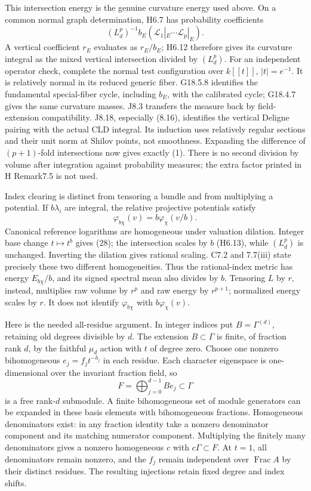 \documentclass[
  10pt,
]{article}
\begin{document}
This intersection energy is the genuine curvature energy used above. On
a common normal graph determination, H6.7 has probability coefficients
\[ (L_d^p)^{-1}b_E(\mathcal L_1|_E\cdots\mathcal L_p|_E). \] A vertical
coefficient \(r_E\) evaluates as \(r_E/b_E\); H6.12 therefore gives its
curvature integral as the mixed vertical intersection divided by
\((L_d^p)\). For an independent operator check, complete the normal test
configuration over \(k[[t]]\), \(|t|=e^{-1}\). It is relatively normal
in its reduced generic fiber. G18.5.8 identifies the fundamental
special-fiber cycle, including \(b_E\), with the calibrated cycle;
G18.4.7 gives the same curvature masses. J8.3 transfers the measure back
by field-extension compatibility. J8.18, especially (8.16), identifies
the vertical Deligne pairing with the actual CLD integral. Its induction
uses relatively regular sections and their unit norm at Shilov points,
not smoothness. Expanding the difference of \((p+1)\)-fold intersections
now gives exactly (1). There is no second division by volume after
integration against probability measures; the extra factor printed in H
Remark7.5 is not used.

Index clearing is distinct from tensoring a bundle and from multiplying
a potential. If \(b\lambda_i\) are integral, the relative projective
potentials satisfy
\[ \varphi_{b\chi}(v)=b\varphi_\chi(v/b).                                                       \tag{28}\]
Canonical reference logarithms are homogeneous under valuation dilation.
Integer base change \(t\mapsto t^b\) gives (28); the intersection scales
by \(b\) (H6.13), while \((L_d^p)\) is unchanged. Inverting the dilation
gives rational scaling. C7.2 and 7.7(iii) state precisely these two
different homogeneities. Thus the rational-index metric has energy
\(E_{b\chi}/b\), and its signed spectral mean also divides by \(b\).
Tensoring \(L\) by \(r\), instead, multiplies raw volume by \(r^p\) and
raw energy by \(r^{p+1}\); normalized energy scales by \(r\). It does
not identify \(\varphi_{b\chi}\) with \(b\varphi_\chi(v)\).

Here is the needed all-residue argument. In integer indices put
\(B=\Gamma^{(d)}\), retaining old degrees divisible by \(d\). The
extension \(B\subset\Gamma\) is finite, of fraction rank \(d\), by the
faithful \(\mu_d\) action with \(t\) of degree zero. Choose one nonzero
bihomogeneous \(e_j=f_jt^{-b_j}\) in each residue. Each character
eigenspace is one-dimensional over the invariant fraction field, so
\[ F=\bigoplus_{j=0}^{d-1}Be_j\subset\Gamma \] is a free rank-\(d\)
submodule. A finite bihomogeneous set of module generators can be
expanded in these basis elements with bihomogeneous fractions.
Homogeneous denominators exist: in any fraction identity take a nonzero
denominator component and its matching numerator component. Multiplying
the finitely many denominators gives a nonzero homogeneous \(c\) with
\(c\Gamma\subset F\). At \(t=1\), all denominators remain nonzero, and
the \(f_j\) remain independent over \(\operatorname{Frac}A\) by their
distinct residues. The resulting injections retain fixed degree and
index shifts.
\end{document}
